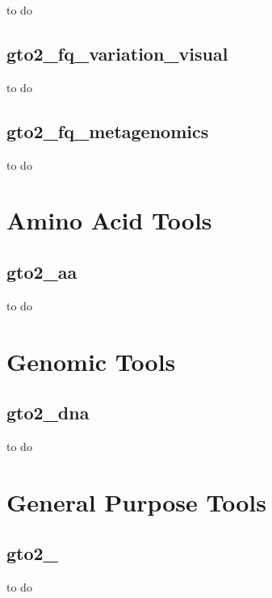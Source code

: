 \documentclass[11pt,]{krantz}
\begin{document}
to do

\section{gto2\_fq\_variation\_visual}\label{gto2_fq_variation_visual}

to do

\section{gto2\_fq\_metagenomics}\label{gto2_fq_metagenomics}

to do

\chapter{Amino Acid Tools}\label{amino-acid-tools}

\section{gto2\_aa}\label{gto2_aa}

to do

\chapter{Genomic Tools}\label{genomic-tools}

\section{gto2\_dna}\label{gto2_dna}

to do

\chapter{General Purpose Tools}\label{general-purpose-tools}

\section{gto2\_}\label{gto2_}

to do



\printindex
\end{document}
